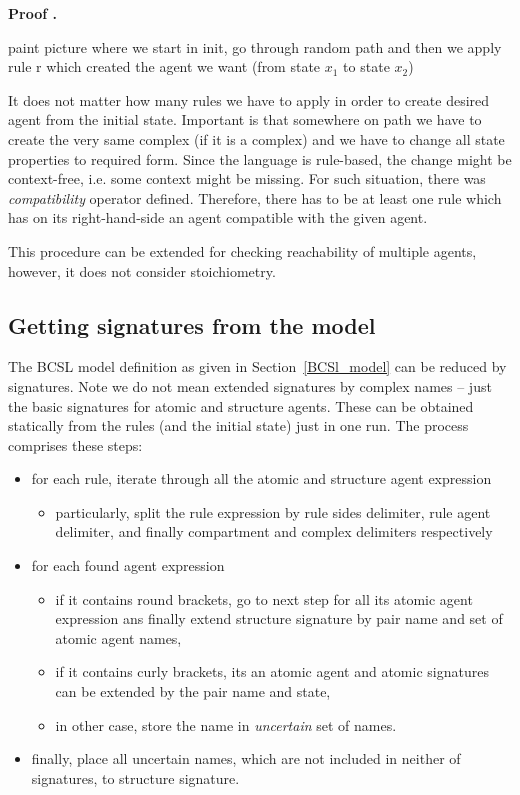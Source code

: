 \documentclass[12pt]{fithesis2}
\newcounter{counter}[section]
\renewcommand{\thecounter}{\thesection.\arabic{counter}}
\newenvironment{proof}{\bigskip\refstepcounter{counter}\noindent\textbf{Proof \thecounter}\par\nopagebreak}{\bigskip}
\begin{document}
\begin{proof}
{paint picture where we start in init, go through random path and then we apply rule r which created the agent we want (from state $x_1$ to state $x_2$)

It does not matter how many rules we have to apply in order to create desired agent from the initial state. Important is that somewhere on path we have to create the very same complex (if it is a complex) and we have to change all state properties to required form. Since the language is rule-based, the change might be context-free, i.e. some context might be missing. For such situation, there was \emph{compatibility} operator defined. Therefore, there has to be at least one rule which has on its right-hand-side an agent compatible with the given agent.}
\end{proof}

This procedure can be extended for checking reachability of multiple agents, however, it does not consider stoichiometry.

\subsection{Getting signatures from the model}

The BCSL model definition as given in Section~\ref{BCSl_model} can be reduced by signatures. Note we do not mean extended signatures by complex names -- just the basic signatures for atomic and structure agents. These can be obtained statically from the rules (and the initial state) just in one run. The process comprises these steps:

\begin{itemize}
\item for each rule, iterate through all the atomic and structure agent expression 
\begin{itemize}
  \item particularly, split the rule expression by rule sides delimiter, rule agent delimiter, and finally compartment and complex delimiters respectively
\end{itemize}
\item for each found agent expression
\begin{itemize}
  \item if it contains round brackets, go to next step for all its atomic agent expression ans finally extend structure signature by pair name and set of atomic agent names,
  \item if it contains curly brackets, its an atomic agent and atomic signatures can be extended by the pair name and state,
  \item in other case, store the name in \emph{uncertain} set of names.
\end{itemize}
\item finally, place all uncertain names, which are not included in neither of signatures, to structure signature.
\end{itemize}
\end{document}
